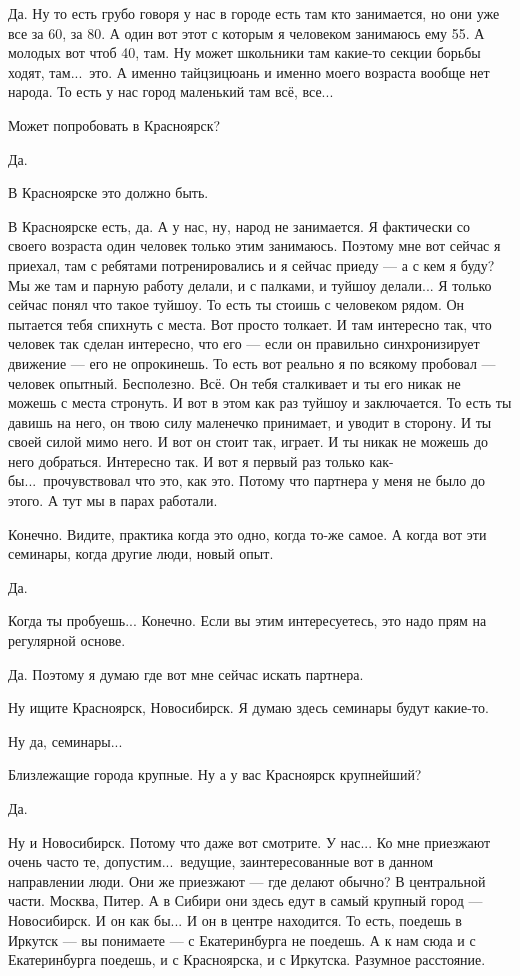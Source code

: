 \I
Да. Ну то есть грубо говоря у нас в городе есть там кто занимается, но они уже все за 60, за 80.
А
один вот этот с которым я человеком занимаюсь ему 55.
А молодых вот чтоб 40, там. Ну может школьники там какие-то секции борьбы ходят, там...\ это. А
именно тайцзицюань и именно моего возраста вообще нет народа.
То есть у нас город маленький там всё, все...

\A
Может попробовать в Красноярск?

\I
Да.

\A
В Красноярске это должно быть.

\I
В Красноярске есть, да.
А у нас, ну, народ не занимается.
Я фактически со своего возраста один человек только этим занимаюсь.
Поэтому мне вот сейчас я приехал, там с ребятами потренировались и я сейчас приеду ---
а с кем я буду?
Мы же там и парную работу делали, и с палками, и туйшоу делали...
Я только сейчас понял что такое туйшоу.
То есть ты стоишь с человеком рядом.
Он пытается тебя спихнуть с места.
Вот просто толкает.
И там интересно так, что человек так сделан интересно, что его
--- если он правильно синхронизирует движение --- его не опрокинешь.
То есть вот реально я по всякому пробовал --- человек опытный.
Бесполезно.
Всё. Он тебя сталкивает и ты его никак не можешь с места стронуть.
И вот в этом как раз туйшоу и заключается.
То есть ты давишь на него, он твою силу маленечко принимает, и уводит в сторону.
И ты своей силой мимо него.
И вот он стоит так, играет.
И ты никак не можешь до него добраться.
Интересно так.
И вот я первый раз только как-бы...\ прочувствовал что это, как это.
Потому что партнера у меня не было до этого.
А тут мы в парах работали.

\A
Конечно.
Видите, практика когда это одно, когда то-же самое.
А когда вот эти семинары, когда другие люди, новый опыт.

\I
Да.

\A
Когда ты пробуешь... Конечно.
Если вы этим интересуетесь, это надо прям на регулярной основе.

\I
Да.
Поэтому я думаю где вот мне сейчас искать партнера.

\A
Ну ищите Красноярск, Новосибирск.
Я думаю здесь семинары будут какие-то.

\I
Ну да, семинары...

\A
Близлежащие города крупные.
Ну а у вас Красноярск крупнейший?

\I
Да.

\A
Ну и Новосибирск.
Потому что даже вот смотрите.
У нас... Ко мне приезжают очень часто те, допустим...\ ведущие,
заинтересованные вот в данном направлении люди.
Они же приезжают --- где делают обычно?
В центральной части.
Москва, Питер.
А в Сибири они здесь едут в
самый крупный город --- Новосибирск.
И он как бы...
И он в центре находится.
То есть, поедешь в Иркутск --- вы понимаете --- с Екатеринбурга не поедешь.
А к нам сюда и с Екатеринбурга поедешь, и с Красноярска, и с Иркутска.
Разумное расстояние.

